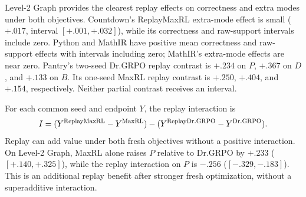 \documentclass{article}
\newcommand{\1}{\mathbf 1}
\theoremstyle{remark}
\theoremstyle{definition}
\theoremstyle{plain}
\begin{document}
\begin{table}[H]
  \centering
  \caption{\textbf{Replay effects on the harder Level-2 tasks at pass 8.}
  MaxRL and Dr.GRPO identify the fresh objective; each effect is its replay
  variant minus the corresponding objective without replay. Each row uses
  its own pairwise intersection, which can exceed the four-method
  intersection. Brackets give paired Student-$t$ intervals for $\Delta B$
  only when all five registered pairs are available.}
  \label{tab:current-e119}
  \scriptsize
  \setlength{\tabcolsep}{3pt}
\end{table}


Level-2 Graph provides the clearest replay effects on correctness and extra
modes under both objectives. Countdown's ReplayMaxRL extra-mode effect is
small ($+.017$, interval $[+.001,+.032]$), while its correctness and raw-support
intervals include zero. Python and MathIR have positive mean correctness
and raw-support effects with intervals including zero; MathIR's extra-mode
effects are near zero. Pantry's two-seed Dr.GRPO replay contrast is
$+.234$ on $P$, $+.367$ on $D$, and $+.133$ on $B$. Its one-seed MaxRL
replay contrast is $+.250$, $+.404$, and $+.154$, respectively. Neither
partial contrast receives an interval.

For each common seed and endpoint $Y$, the replay interaction is
\[
 I=(Y^{\rm ReplayMaxRL}-Y^{\rm MaxRL})
    -(Y^{\rm ReplayDr.GRPO}-Y^{\rm Dr.GRPO}).
\]
Replay can add value under both fresh objectives without a positive
interaction. On Level-2 Graph, MaxRL alone raises $P$ relative to Dr.GRPO
by $+.233$ ($[+.140,+.325]$), while the replay interaction on $P$ is
$-.256$ ($[-.329,-.183]$). This is an additional replay benefit after
stronger fresh optimization, without a superadditive interaction.
\end{document}

